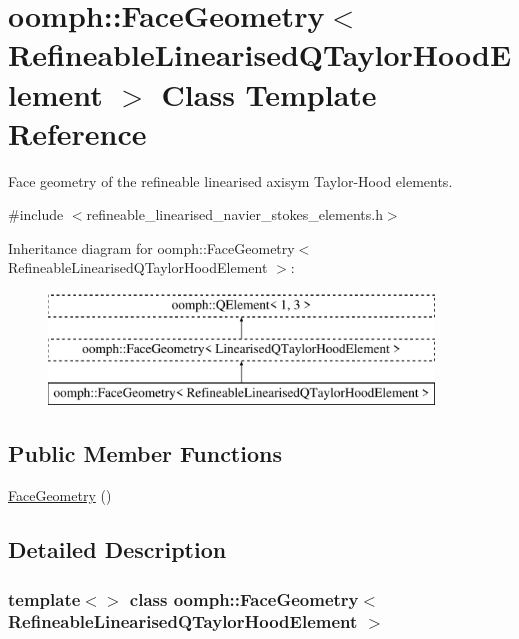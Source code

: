 \hypertarget{classoomph_1_1FaceGeometry_3_01RefineableLinearisedQTaylorHoodElement_01_4}{}\section{oomph\+:\+:Face\+Geometry$<$ Refineable\+Linearised\+Q\+Taylor\+Hood\+Element $>$ Class Template Reference}
\label{classoomph_1_1FaceGeometry_3_01RefineableLinearisedQTaylorHoodElement_01_4}


Face geometry of the refineable linearised axisym Taylor-\/\+Hood elements.  




{\ttfamily \#include $<$refineable\+\_\+linearised\+\_\+navier\+\_\+stokes\+\_\+elements.\+h$>$}

Inheritance diagram for oomph\+:\+:Face\+Geometry$<$ Refineable\+Linearised\+Q\+Taylor\+Hood\+Element $>$\+:\begin{figure}[H]
\begin{center}
\leavevmode
\includegraphics[height=3.000000cm]{classoomph_1_1FaceGeometry_3_01RefineableLinearisedQTaylorHoodElement_01_4}
\end{center}
\end{figure}
\subsection*{Public Member Functions}
\begin{DoxyCompactItemize}
\item 
\hyperlink{classoomph_1_1FaceGeometry_3_01RefineableLinearisedQTaylorHoodElement_01_4_ae1395700e28670539e65baa44d1e40b3}{Face\+Geometry} ()
\end{DoxyCompactItemize}


\subsection{Detailed Description}
\subsubsection*{template$<$$>$\newline
class oomph\+::\+Face\+Geometry$<$ Refineable\+Linearised\+Q\+Taylor\+Hood\+Element $>$}

